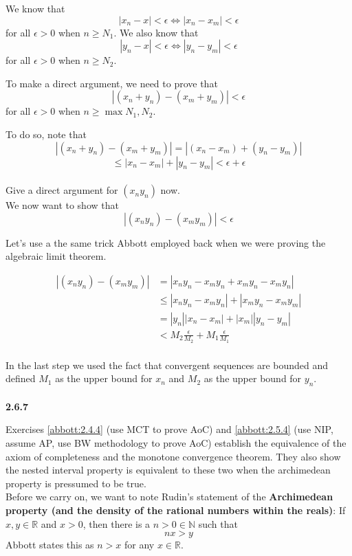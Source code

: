 We know that
$$
| x_n - x | < \epsilon \Longleftrightarrow |x_n - x_m| < \epsilon
$$
for all $\epsilon > 0$ when $n\geq N_1$.
We also know that
$$
| y_n - x | < \epsilon \Longleftrightarrow |y_n - y_m| < \epsilon
$$
for all $\epsilon > 0$ when $n\geq N_2$.

To make a direct argument, we need to prove that
$$
|(x_n + y_n) - (x_m + y_m)| < \epsilon
$$
for all $\epsilon >0$ when $n \geq \max{N_1, N_2}$.

To do so, note that
$$
|(x_n + y_n) - (x_m + y_m)| 
= |(x_n - x_m) + (y_n - y_m)|
$$
$$
\leq |x_n - x_m| + |y_n - y_m|
< \epsilon + \epsilon
$$
\\

Give a direct argument for $(x_n y_n)$ now.
\\

We now want to show that
$$
|(x_n y_n) - (x_m y_m)| < \epsilon
$$

Let's use a the same trick Abbott employed back when we were proving the algebraic
limit theorem.

\begin{align*}
    |(x_n y_n) - (x_m y_m)| &= |x_n y_n - x_m y_n + x_m y_n - x_m y_n|      \\
    &\leq |x_n y_n - x_m y_n| + |x_m y_n - x_m y_m|     \\
    &= |y_n| |x_n - x_m| + |x_m| |y_n - y_m|    \\
    &< M_2 \frac{\epsilon}{M_2} + M_1 \frac{\epsilon}{M_1} \\
\end{align*}

In the last step we used the fact that convergent sequences are bounded and defined
$M_1$ as the upper bound for $x_n$ and $M_2$ as the upper bound for $y_n$.
\\~\\



\textbf{2.6.7}

Exercises \ref{abbott:2.4.4} (use MCT to prove AoC) and
\ref{abbott:2.5.4} (use NIP, assume AP, use BW methodology to prove AoC) establish the equivalence of the axiom of
completeness and the monotone convergence theorem.
They also show the nested interval property is equivalent to these two when the archimedean property
is pressumed to be true.
\\

Before we carry on, we want to note Rudin's statement of the \textbf{Archimedean property (and the density
of the rational numbers within the reals)}:
If $x,y\in\mathbb{R}$ and $x>0$, then there is a $n>0 \in \mathbb{N}$ such that
$$
nx > y
$$
Abbott states this as $n > x$ for any $x\in\mathbb{R}$.
\\

